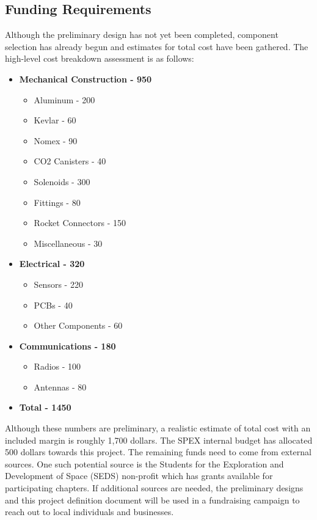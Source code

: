 \documentclass[conference]{IEEEtran} %
\begin{document}
\subsection{Funding Requirements}
\label{subsec:Funding Requirements}
Although the preliminary design has not yet been completed, component selection has already begun and estimates for total cost have been
gathered. The high-level cost breakdown assessment is as follows:
\begin{itemize}
  \item \textbf{Mechanical Construction - 950}
  \begin{itemize}
    \item Aluminum - 200
    \item Kevlar - 60
    \item Nomex - 90
    \item CO2 Canisters - 40
    \item Solenoids - 300
    \item Fittings - 80
    \item Rocket Connectors - 150
    \item Miscellaneous - 30
  \end{itemize}

  \item \textbf{Electrical - 320}
  \begin{itemize}
    \item Sensors - 220
    \item PCBs - 40
    \item Other Components - 60
  \end{itemize}

  \item \textbf{Communications - 180}
  \begin{itemize}
    \item Radios - 100
    \item Antennas - 80
  \end{itemize}

  \item \textbf{Total - 1450}
\end{itemize}

Although these numbers are preliminary, a realistic estimate of total cost with an included margin is roughly 1,700 dollars. The SPEX internal budget has allocated 500 dollars
towards this project. The remaining funds need to come from external sources. One such potential source is the Students for the Exploration and Development
of Space (SEDS) non-profit which has grants available for participating chapters. If additional sources are needed, the preliminary designs and this
project definition document will be used in a fundraising campaign to reach out to local individuals and businesses.
\end{document}

